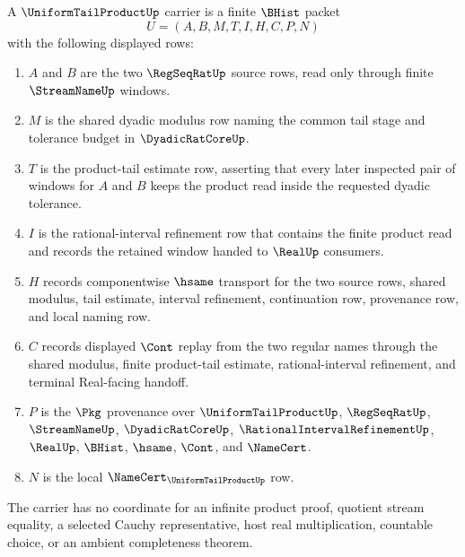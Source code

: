 \begin{definition}
\label{def:uniform-tail-product-carrier}
A $\UniformTailProductUp$ carrier is a finite $\BHist$ packet
$$
U=(A,B,M,T,I,H,C,P,N)
$$
with the following displayed rows:
\begin{enumerate}
\item $A$ and $B$ are the two $\RegSeqRatUp$ source rows, read only through finite $\StreamNameUp$ windows.
\item $M$ is the shared dyadic modulus row naming the common tail stage and tolerance budget in $\DyadicRatCoreUp$.
\item $T$ is the product-tail estimate row, asserting that every later inspected pair of windows for $A$ and $B$ keeps the product read inside the requested dyadic tolerance.
\item $I$ is the rational-interval refinement row that contains the finite product read and records the retained window handed to $\RealUp$ consumers.
\item $H$ records componentwise $\hsame$ transport for the two source rows, shared modulus, tail estimate, interval refinement, continuation row, provenance row, and local naming row.
\item $C$ records displayed $\Cont$ replay from the two regular names through the shared modulus, finite product-tail estimate, rational-interval refinement, and terminal Real-facing handoff.
\item $P$ is the $\Pkg$ provenance over $\UniformTailProductUp$, $\RegSeqRatUp$, $\StreamNameUp$, $\DyadicRatCoreUp$, $\RationalIntervalRefinementUp$, $\RealUp$, $\BHist$, $\hsame$, $\Cont$, and $\NameCert$.
\item $N$ is the local $\NameCert_{\UniformTailProductUp}$ row.
\end{enumerate}
The carrier has no coordinate for an infinite product proof, quotient stream equality, a selected Cauchy representative, host real multiplication, countable choice, or an ambient completeness theorem.
\end{definition}

